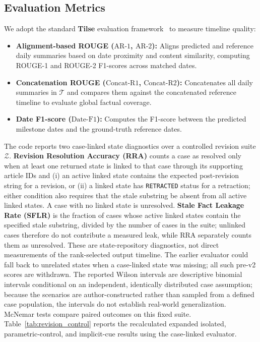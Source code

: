 \documentclass[journal]{IEEEtran}
\begin{document}
\subsection{Evaluation Metrics}
\label{subsec:metrics}

We adopt the standard \textbf{Tilse} evaluation framework~\cite{martschat2017improving, martschat2018temporally} to measure timeline quality:
\begin{itemize}
    \item \textbf{Alignment-based ROUGE ($\text{AR-1}$, $\text{AR-2}$):} Aligns predicted and reference daily summaries based on date proximity and content similarity, computing ROUGE-1 and ROUGE-2 F1-scores across matched dates.
    \item \textbf{Concatenation ROUGE ($\text{Concat-R1}$, $\text{Concat-R2}$):} Concatenates all daily summaries in $\mathcal{T}$ and compares them against the concatenated reference timeline to evaluate global factual coverage.
    \item \textbf{Date F1-score ($\text{Date-F1}$):} Computes the F1-score between the predicted milestone dates and the ground-truth reference dates.
\end{itemize}

The code reports two case-linked state diagnostics over a controlled revision suite $\mathcal{Z}$. \textbf{Revision Resolution Accuracy (RRA)} counts a case as resolved only when at least one returned state is linked to that case through its supporting article IDs and (i) an active linked state contains the expected post-revision string for a revision, or (ii) a linked state has \texttt{RETRACTED} status for a retraction; either condition also requires that the stale substring be absent from all active linked states. A case with no linked state is unresolved. \textbf{Stale Fact Leakage Rate (SFLR)} is the fraction of cases whose active linked states contain the specified stale substring, divided by the number of cases in the suite; unlinked cases therefore do not contribute a measured leak, while RRA separately counts them as unresolved. These are state-repository diagnostics, not direct measurements of the rank-selected output timeline. The earlier evaluator could fall back to unrelated states when a case-linked state was missing; all such pre-v2 scores are withdrawn. The reported Wilson intervals are descriptive binomial intervals conditional on an independent, identically distributed case assumption; because the scenarios are author-constructed rather than sampled from a defined case population, the intervals do not establish real-world generalization. McNemar tests compare paired outcomes on this fixed suite. Table~\ref{tab:revision_control} reports the recalculated expanded isolated, parametric-control, and implicit-cue results using the case-linked evaluator.
\end{document}
